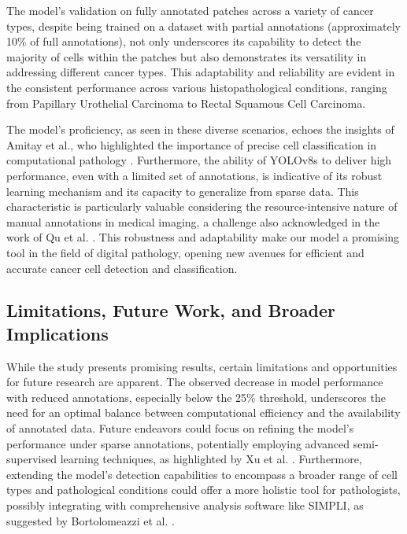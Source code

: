 \documentclass[anon]{midl} %
\begin{document}
The model's validation on fully annotated patches across a variety of cancer types, despite being trained on a dataset with partial annotations (approximately 10\% of full annotations), not only underscores its capability to detect the majority of cells within the patches but also demonstrates its versatility in addressing different cancer types. This adaptability and reliability are evident in the consistent performance across various histopathological conditions, ranging from Papillary Urothelial Carcinoma to Rectal Squamous Cell Carcinoma.

The model's proficiency, as seen in these diverse scenarios, echoes the insights of Amitay et al., who highlighted the importance of precise cell classification in computational pathology \cite{amitay2023cellsighter}. Furthermore, the ability of YOLOv8s to deliver high performance, even with a limited set of annotations, is indicative of its robust learning mechanism and its capacity to generalize from sparse data. This characteristic is particularly valuable considering the resource-intensive nature of manual annotations in medical imaging, a challenge also acknowledged in the work of Qu et al. \cite{qu2020weakly}. This robustness and adaptability make our model a promising tool in the field of digital pathology, opening new avenues for efficient and accurate cancer cell detection and classification.

\subsection{Limitations, Future Work, and Broader Implications}

While the study presents promising results, certain limitations and opportunities for future research are apparent. The observed decrease in model performance with reduced annotations, especially below the 25\% threshold, underscores the need for an optimal balance between computational efficiency and the availability of annotated data. Future endeavors could focus on refining the model's performance under sparse annotations, potentially employing advanced semi-supervised learning techniques, as highlighted by Xu et al. \cite{xu2021end}. Furthermore, extending the model's detection capabilities to encompass a broader range of cell types and pathological conditions could offer a more holistic tool for pathologists, possibly integrating with comprehensive analysis software like SIMPLI, as suggested by Bortolomeazzi et al. \cite{bortolomeazzi2022simpli}.
\end{document}

